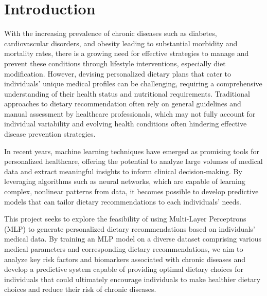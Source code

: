 \section{Introduction}
With the increasing prevalence of chronic diseases such as diabetes, cardiovascular disorders, and obesity leading to substantial morbidity and mortality rates, there is a growing need for effective strategies to manage and prevent these conditions through lifestyle interventions, especially diet modification. However, devising personalized dietary plans that cater to individuals' unique medical profiles can be challenging, requiring a comprehensive understanding of their health status and nutritional requirements. Traditional approaches to dietary recommendation often rely on general guidelines and manual assessment by healthcare professionals, which may not fully account for individual variability and evolving health conditions often hindering effective disease prevention strategies.

In recent years, machine learning techniques have emerged as promising tools for personalized healthcare, offering the potential to analyze large volumes of medical data and extract meaningful insights to inform clinical decision-making. By leveraging algorithms such as neural networks, which are capable of learning complex, nonlinear patterns from data, it becomes possible to develop predictive models that can tailor dietary recommendations to each individuals' needs.

This project seeks to explore the feasibility of using Multi-Layer Perceptrons (MLP) to generate personalized dietary recommendations based on individuals' medical data. By training an MLP model on a diverse dataset comprising various medical parameters and corresponding dietary recommendations, we aim to analyze key risk factors and biomarkers associated with chronic diseases and develop a predictive system capable of providing optimal dietary choices for individuals that could ultimately encourage individuals to make healthier dietary choices and reduce their risk of chronic diseases.